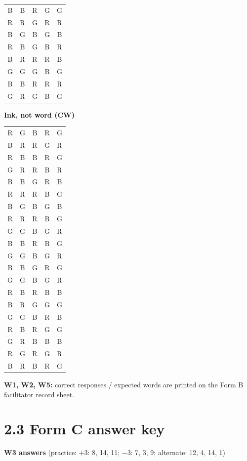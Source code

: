 \documentclass[10pt,a4paper]{article}
\begin{document}
\begin{minipage}[t]{0.3\linewidth}
\begin{tabular}{ccccc}
B & B & R & G & G\\
R & R & G & R & R\\
B & G & B & G & B\\
R & B & G & B & R\\
B & R & R & R & B\\
G & G & G & B & G\\
B & B & R & R & R\\
G & R & G & B & G\\\end{tabular}\end{minipage}\hfill\begin{minipage}[t]{0.3\linewidth}\centering\textbf{Ink, not word (CW)}\\[2pt]\ttfamily\footnotesize\begin{tabular}{ccccc}R & G & B & R & G\\
B & R & R & G & R\\
R & B & B & R & G\\
G & R & R & B & R\\
B & B & G & R & B\\
R & R & R & B & G\\
B & G & B & G & B\\
R & R & R & B & G\\
G & G & B & G & R\\
B & B & R & B & G\\
G & G & B & G & R\\
B & B & G & R & G\\
G & G & B & G & R\\
R & B & R & B & B\\
B & R & G & G & G\\
G & G & B & R & B\\
R & B & R & G & G\\
G & R & B & B & B\\
R & G & R & G & R\\
B & R & B & R & G\\\end{tabular}\end{minipage}\par\medskip
\textbf{W1, W2, W5:} correct responses / expected words are printed on the Form B facilitator record sheet.
\clearpage\section*{2.3 Form C answer key}
\textbf{W3 answers} (practice: +3: 8, 14, 11; $-$3: 7, 3, 9; alternate: 12, 4, 14, 1)\par
\end{document}
